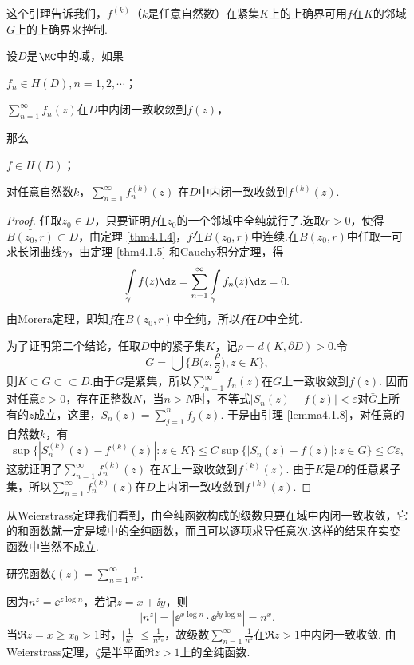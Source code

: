 这个引理告诉我们，$f^{(k)}$（$k$是任意自然数）在紧集$K$上的上确界可用$f$在$K$的邻域$G$上的上确界来控制.
\begin{theorem}\label{thm4.1.9}
设$D$是$\MC$中的域，如果
\begin{eenum}
  \item $f_n\in H(D),n=1,2,\cdots$；
  \item $\sum_{n=1}^\infty f_n(z)$在$D$中内闭一致收敛到$f(z)$，
\end{eenum}
那么
\begin{eenum}
  \item $f\in H(D)$；
  \item 对任意自然数$k$，$\sum_{n=1}^\infty f^{(k)}_n(z)$ 在$D$中内闭一致收敛到$f^{(k)}(z)$.
\end{eenum}
\end{theorem}
\begin{proof}
任取$z_0\in D$，只要证明$f$在$z_0$的一个邻域中全纯就行了.选取$r>0$，使得$\bar{B(z_0,r)}\subset D$，由定理 \ref{thm4.1.4}，$f$在$B(z_0,r)$中连续.在$B(z_0,r)$中任取一可求长闭曲线$\gamma$，由定理 \ref{thm4.1.5} 和Cauchy积分定理，得
\[\int\limits_\gamma f(z)\dz=\sum_{n=1}^\infty \int\limits_\gamma f_n(z)\dz=0.\]
由Morera定理，即知$f$在$B(z_0,r)$中全纯，所以$f$在$D$中全纯.

为了证明第二个结论，任取$D$中的紧子集$K$，记$\rho=d(K,\partial D)>0$.令
\[G=\bigcup\bigg\{B\bigg(z,\frac\rho2\bigg),z\in K\bigg\},\]
则$K\subset G\subset\subset D$.由于$\bar G$是紧集，所以$\sum_{n=1}^\infty f_n(z)$在$\bar G$上一致收敛到$f(z)$. 因而对任意$\varepsilon>0$，存在正整数$N$，当$n>N$时，不等式$|S_n(z)-f(z)|<\varepsilon$对$\bar G$上所有的$z$成立，这里，$S_n(z)=\sum_{j=1}^nf_j(z)$. 于是由引理 \ref{lemma4.1.8}，对任意的自然数$k$，有
\[\sup\{|S_n^{(k)}(z)-f^{(k)}(z)|:z\in K\}\le C\sup\{|S_n(z)-f(z)|:z\in G\}\le C\varepsilon,\]
这就证明了$\sum_{n=1}^\infty f^{(k)}_n(z)$ 在$K$上一致收敛到$f^{(k)}(z)$. 由于$K$是$D$的任意紧子集，所以$\sum_{n=1}^\infty f_n^{(k)}(z)$在$D$上内闭一致收敛到$f^{(k)}(z)$.
\end{proof}

从Weierstrass定理我们看到，由全纯函数构成的级数只要在域中内闭一致收敛，它的和函数就一定是域中的全纯函数，而且可以逐项求导任意次.这样的结果在实变函数中当然不成立.
\begin{example}\label{exam4.1.10}
研究函数$\zeta(z)=\sum_{n=1}^\infty\frac1{n^z}$.
\end{example}
\begin{solution}
因为$n^z=\ee^{z\log n}$，若记$z=x+\ii y$，则
\[|n^z|=|\ee^{x\log n}\cdot\ee^{\ii y\log n}|=n^x.\]
当$\Re z=x\ge x_0>1$时，$\bigg|\frac1{n^z}\bigg|\le\frac1{n^{x_0}}$，故级数$\sum_{n=1}^\infty\frac1{n^z}$在$\Re z>1$中内闭一致收敛. 由Weierstrass定理，$\zeta$是半平面$\Re z>1$上的全纯函数.
\end{solution}


